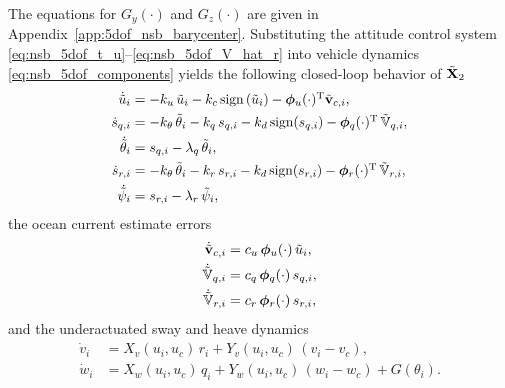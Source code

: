 \noindent The equations for $G_y(\cdot)$ and $G_z(\cdot)$ are given in Appendix~\ref{app:5dof_nsb_barycenter}.
Substituting the attitude control system \eqref{eq:nsb_5dof_t_u}--\eqref{eq:nsb_5dof_V_hat_r} into vehicle dynamics \eqref{eq:nsb_5dof_components} yields the following closed-loop behavior of $\tilde{\mathbf{X}}_2$
\begin{subequations}
    \begin{align}
        \scale[0.97]{\dot{\tilde{u}}_i} &= \scale[0.97]{- k_u\,\tilde{u}_i - k_c\,{\rm sign}\left(\tilde{u}_i\right) - \bs{\phi}_u(\cdot)\T\tilde{\ivel}_{c,i},} \label{eq:nsb_5dof_u_tilde} \\
        \scale[0.97]{\dot{s}_{q,i}} &= \scale[0.97]{-k_{\theta}\,\tilde{\theta}_i - k_q\,s_{q,i} - k_d\,{\rm sign}(s_{q,i}) - \bs{\phi}_q(\cdot)\T\,\tilde{\mathbb{V}}_{q,i}, }\\
        \scale[0.97]{\dot{\tilde{\theta}}_i} &= \scale[0.97]{s_{q,i} - \lambda_q\,\tilde{\theta}_i,} \\
        \scale[0.97]{\dot{s}_{r,i}} &= \scale[0.97]{-k_{\theta}\,\tilde{\theta}_i - k_r\,s_{r,i} - k_d\,{\rm sign}(s_{r,i}) - \bs{\phi}_r(\cdot)\T\,\tilde{\mathbb{V}}_{r,i},} \\
        \scale[0.97]{\dot{\tilde{\psi}}_i} &= \scale[0.97]{s_{r,i} - \lambda_r\,\tilde{\psi}_i,} \label{eq:nsb_5dof_psi_tilde}
    \end{align} \label{eq:nsb_5dof_perturbing}
\end{subequations}
the ocean current estimate errors
\begin{subequations}
    \begin{align}
        \dot{\tilde{\mathbf{v}}}_{c,i} & = c_u\,\bm{\phi}_u(\cdot)\,\tilde{u}_i, \label{eq:nsb_5dof_V_c_tilde} \\
        \dot{\tilde{\mathbb{V}}}_{q,i} &= c_q\,\bm{\phi}_q(\cdot)\,s_{q,i}, \\
        \dot{\tilde{\mathbb{V}}}_{r,i} &= c_r\,\bm{\phi}_r(\cdot)\,s_{r,i}, \label{eq:nsb_5dof_theta_r_tilde}
    \end{align} \label{eq:nsb_5dof_estimates}
\end{subequations}
and the underactuated sway and heave dynamics
\begin{align}
    \dot{v}_i &= X_v(u_i, u_c)\,r_i + Y_v(u_i, u_c)\,(v_i - v_c), \label{eq:nsb_5dof_v_dot} \\
    \dot{w}_i &= X_w(u_i, u_c)\,q_i + Y_w(u_i, u_c)\,(w_i - w_c) + G(\theta_i). \label{eq:nsb_5dof_w_dot}
\end{align}

